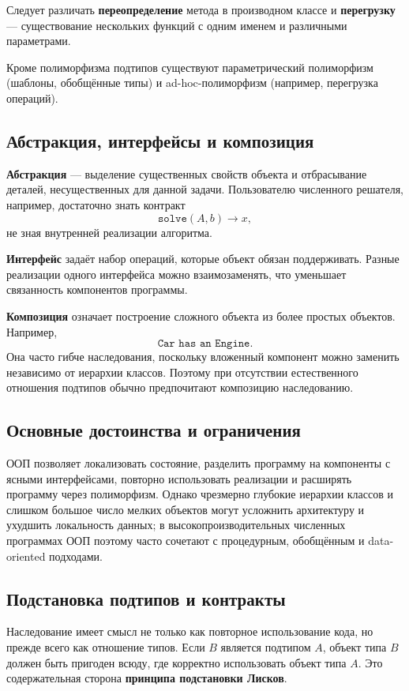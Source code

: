 Следует различать \textbf{переопределение} метода в производном классе и \textbf{перегрузку} --- существование нескольких функций с одним именем и различными параметрами.

Кроме полиморфизма подтипов существуют параметрический полиморфизм (шаблоны, обобщённые типы) и ad-hoc-полиморфизм (например, перегрузка операций).

\subsection{Абстракция, интерфейсы и композиция}

\textbf{Абстракция} --- выделение существенных свойств объекта и отбрасывание деталей, несущественных для данной задачи. Пользователю численного решателя, например, достаточно знать контракт
\[
\texttt{solve}(A,b)\longrightarrow x,
\]
не зная внутренней реализации алгоритма.

\textbf{Интерфейс} задаёт набор операций, которые объект обязан поддерживать. Разные реализации одного интерфейса можно взаимозаменять, что уменьшает связанность компонентов программы.

\textbf{Композиция} означает построение сложного объекта из более простых объектов. Например,
\[
\texttt{Car has an Engine}.
\]
Она часто гибче наследования, поскольку вложенный компонент можно заменить независимо от иерархии классов. Поэтому при отсутствии естественного отношения подтипов обычно предпочитают композицию наследованию.

\subsection{Основные достоинства и ограничения}

ООП позволяет локализовать состояние, разделить программу на компоненты с ясными интерфейсами, повторно использовать реализации и расширять программу через полиморфизм. Однако чрезмерно глубокие иерархии классов и слишком большое число мелких объектов могут усложнить архитектуру и ухудшить локальность данных; в высокопроизводительных численных программах ООП поэтому часто сочетают с процедурным, обобщённым и data-oriented подходами.


\subsection{Подстановка подтипов и контракты}

Наследование имеет смысл не только как повторное использование кода, но прежде
всего как отношение типов. Если $B$ является подтипом $A$, объект типа $B$
должен быть пригоден всюду, где корректно использовать объект типа $A$.
Это содержательная сторона \textbf{принципа подстановки Лисков}.

